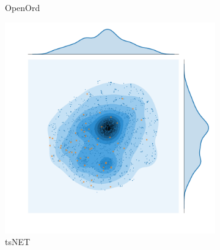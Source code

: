 \begin{figure}[H]
\begin{subfigure}[b]{.49\textwidth}
         \caption{OpenOrd}
         \label{fig:oo}
     \end{subfigure}
         \begin{subfigure}[b]{.49\textwidth}
         \centering \includegraphics[width=\textwidth,angle=-90]{figures_c1/layout/tsnet_aphh.pdf}
         \caption{tsNET}
         \label{fig:ts}
     \end{subfigure}
      \hfill
        \caption{ }
        \label{fig:densitycompare}
\end{figure}


